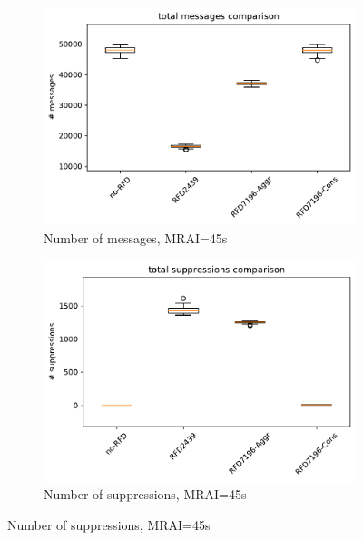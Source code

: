 \begin{figure}[H]
     \hfill
     \begin{subfigure}[b]{0.325\textwidth}
         \centering
         \includegraphics[width=\textwidth]{images/RFD/miceVSelephants/MultiMRAI/45/mice/cisco_1000MRAI45_rfd_comparison_messages_boxplot.pdf}
         \caption{\scriptsize Number of messages, MRAI=45s}
         \label{fig:1000_RFD_MRAI45_messages_mice}
     \end{subfigure}
     \hfill
     \begin{subfigure}[b]{0.325\textwidth}
         \centering
         \includegraphics[width=\textwidth]{images/RFD/miceVSelephants/MultiMRAI/45/mice/cisco_1000MRAI45_rfd_comparison_suppressions_boxplot.pdf}
         \caption{\scriptsize Number of suppressions, MRAI=45s}
         \label{fig:1000_RFD_MRAI45_suppressions_mice}
     \end{subfigure}

\end{figure}
